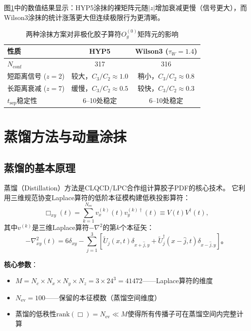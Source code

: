 \documentclass[12pt,a4paper]{ctexart}
\theoremstyle{definition}
\begin{document}
图\ref{fig:smear_comparison}中的数值结果\cite{NoteGluonPDFs}显示：HYP5涂抹的裸矩阵元随$|z|$增加衰减更慢（信号更大），而
Wilson3涂抹的统计涨落更大但连续极限行为更清晰。

\begin{table}[H]
\centering
\caption{两种涂抹方案对非极化胶子算符$O^{(0)}_g$矩阵元的影响\cite{NoteGluonPDFs}}
\label{fig:smear_comparison}
\begin{tabular}{lcc}
\toprule
性质 & HYP5 & Wilson3 ($\tau_W=1.4$) \\
\midrule
$N_{\text{conf}}$ & 317 & 316 \\
短距离信号 ($z=2$) & 较大，$C_3/C_2\approx1.0$ & 稍小，$C_3/C_2\approx0.8$ \\
长距离衰减 ($z=7$) & 缓慢，$C_3/C_2\approx0.5$ & 较快，$C_3/C_2\approx0.3$ \\
$t_{\text{sep}}$稳定性 & 6--10处稳定 & 6--10处稳定 \\
\bottomrule
\end{tabular}
\end{table}

\section{蒸馏方法与动量涂抹}

\subsection{蒸馏的基本原理}

蒸馏（Distillation）方法\cite{Peardon2009,本库补充5}是CLQCD/LPC合作组计算胶子PDF的核心技术。
它利用三维规范协变Laplace算符的低阶本征模构建低秩投影算符\cite{NoteGluonPDFs,Egerer2021a}：
\begin{equation}
\Box_{xy}(t) = \sum_{k=1}^{N_{\text{ev}}} v_x^{(k)}(t) v_y^{(k)\dagger}(t) \equiv V(t)V^\dagger(t),
\label{eq:distillation_op}
\end{equation}
其中$v^{(k)}$是三维Laplace算符$- \nabla^2$的第$k$个本征矢：
\begin{equation}
-\nabla^2_{xy}(t) = 6\delta_{xy} - \sum_{j=1}^{3} \left[ \tilde{U}_j(x,t)\delta_{x+\hat{j},y} + \tilde{U}_j^\dagger(x-\hat{j},t)\delta_{x-\hat{j},y} \right]。
\end{equation}

\textbf{核心参数}\cite{NoteGluonPDFs}：
\begin{itemize}
    \item $M = N_c\times N_x\times N_y\times N_z = 3\times24^3 = 41472$——Laplace算符的维度
    \item $N_{\text{ev}} = 100$——保留的本征模数（蒸馏空间维度）
    \item 蒸馏的低秩性$\text{rank}(\Box) = N_{\text{ev}} \ll M$使得所有传播子可在蒸馏空间内完整计算
\end{itemize}
\end{document}
